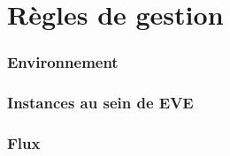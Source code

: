 \section{Règles de gestion}
\label{gestion}
\subsubsection{Environnement}
\subsubsection{Instances au sein de EVE}
\subsubsection{Flux}